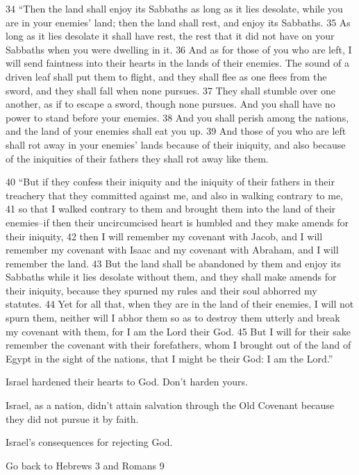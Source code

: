 \begin{bible}
34 ``Then the land shall enjoy its Sabbaths as long as it lies desolate, while you are in your enemies' land; then the land shall rest, and enjoy its Sabbaths. 35 As long as it lies desolate it shall have rest, the rest that it did not have on your Sabbaths when you were dwelling in it. 36 And as for those of you who are left, I will send faintness into their hearts in the lands of their enemies. The sound of a driven leaf shall put them to flight, and they shall flee as one flees from the sword, and they shall fall when none pursues. 37 They shall stumble over one another, as if to escape a sword, though none pursues. And you shall have no power to stand before your enemies. 38 And you shall perish among the nations, and the land of your enemies shall eat you up. 39 And those of you who are left shall rot away in your enemies' lands because of their iniquity, and also because of the iniquities of their fathers they shall rot away like them.

40 ``But if they confess their iniquity and the iniquity of their fathers in their treachery that they committed against me, and also in walking contrary to me, 41 so that I walked contrary to them and brought them into the land of their enemies--if then their uncircumcised heart is humbled and they make amends for their iniquity, 42 then I will remember my covenant with Jacob, and I will remember my covenant with Isaac and my covenant with Abraham, and I will remember the land. 43 But the land shall be abandoned by them and enjoy its Sabbaths while it lies desolate without them, and they shall make amends for their iniquity, because they spurned my rules and their soul abhorred my statutes. 44 Yet for all that, when they are in the land of their enemies, I will not spurn them, neither will I abhor them so as to destroy them utterly and break my covenant with them, for I am the Lord their God. 45 But I will for their sake remember the covenant with their forefathers, whom I brought out of the land of Egypt in the sight of the nations, that I might be their God: I am the Lord.''
		
\end{bible}

\begin{discussion}



 Israel hardened their hearts to God.  Don't harden yours.

 Israel, as a nation,  didn't attain salvation through the Old Covenant because they did not pursue it by faith.


 Israel's consequences for rejecting God.

Go back to Hebrews 3 and Romans 9

\end{discussion}

